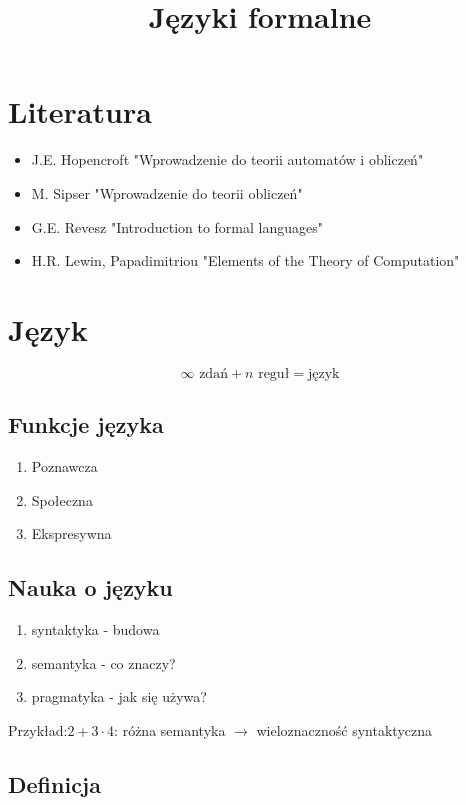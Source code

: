 \documentclass{../notatki}
\title{Języki formalne}
\begin{document}
\tableofcontents

\section{Literatura}

\begin{itemize}
    \item J.E. Hopencroft "Wprowadzenie do teorii automatów i obliczeń"
    \item M. Sipser "Wprowadzenie do teorii obliczeń"
    \item G.E. Revesz "Introduction to formal languages"
    \item H.R. Lewin, Papadimitriou "Elements of the Theory of Computation"
\end{itemize}

\section{Język}

$$
\infty \text{ zdań} + n \text{ reguł} = \text{język}
$$

\subsection{Funkcje języka}

\begin{enumerate}
    \item Poznawcza
    \item Społeczna
    \item Ekspresywna
\end{enumerate}

\subsection{Nauka o języku}

\begin{enumerate}
    \item syntaktyka - budowa
    \item semantyka - co znaczy?
    \item pragmatyka - jak się używa?
\end{enumerate}
Przykład:$2 + 3 \cdot 4$: różna semantyka $\rightarrow$ wieloznaczność syntaktyczna

\subsection{Definicja}
\end{document}
